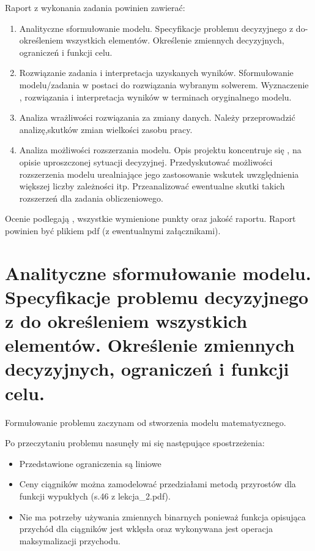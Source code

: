 \documentclass{article}
\begin{document}
\noindent
Raport z wykonania zadania powinien zawierać:

\begin{enumerate}
    \item Analityczne sformułowanie modelu. Specyfikacje problemu decyzyjnego z do-określeniem wszystkich elementów. Określenie zmiennych decyzyjnych, ograniczeń i funkcji celu.
    \item Rozwiązanie zadania i interpretacja uzyskanych wyników. Sformułowanie modelu/zadania w postaci do rozwiązania wybranym solwerem.  Wyznaczenie , rozwiązania i interpretacja wyników w terminach oryginalnego modelu.
    \item Analiza wrażliwości rozwiązania za zmiany danych. Należy przeprowadzić analizę,skutków zmian wielkości zasobu pracy.
    \item Analiza możliwości rozszerzania modelu. Opis projektu koncentruje się , na opisie uproszczonej sytuacji decyzyjnej. Przedyskutować możliwości rozszerzenia modelu urealniające jego zastosowanie wskutek uwzględnienia większej liczby zależności itp.
      Przeanalizować ewentualne skutki takich rozszerzeń dla zadania obliczeniowego.
\end{enumerate}

Ocenie podlegają , wszystkie wymienione punkty oraz jakość raportu.
Raport powinien być plikiem pdf (z ewentualnymi załącznikami).

\section{Analityczne sformułowanie modelu. Specyfikacje problemu decyzyjnego z do określeniem wszystkich elementów. Określenie zmiennych decyzyjnych, ograniczeń i funkcji celu.}

\noindent
Formułowanie problemu zaczynam od stworzenia modelu matematycznego.

\noindent
Po przeczytaniu problemu nasunęły mi się następujące spostrzeżenia:

\begin{itemize}
	\item Przedstawione ograniczenia są liniowe
	\item Ceny ciągników można zamodelować przedziałami metodą przyrostów dla funkcji wypukłych (s.46 z lekcja\_2.pdf). 
	\item Nie ma potrzeby używania zmiennych binarnych ponieważ funkcja opisująca przychód dla ciągników jest wklęsła oraz wykonywana jest operacja maksymalizacji przychodu.
\end{itemize}
\end{document}
